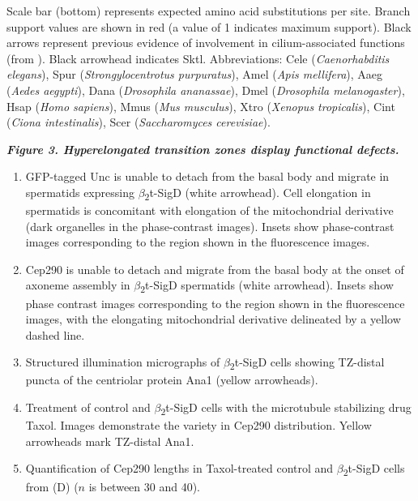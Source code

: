 \documentclass[12pt, twoside, letterpaper]{article}
\newcommand{\sigd}{$\beta$\textsubscript{2}t-SigD}
\begin{document}
\begin{doublespacing}
\begin{linenumbers}
\begin{enumerate}[label={(\Alph*)}, nolistsep]
      Scale bar (bottom) represents expected amino acid substitutions per site. Branch support values are shown in red (a value of 1 indicates maximum support).
      Black arrows represent previous evidence of involvement in cilium-associated functions (from \citep{xu2016phosphatidylinositol}).
      Black arrowhead indicates Sktl.
      Abbreviations: Cele (\textit{Caenorhabditis elegans}), Spur (\textit{Strongylocentrotus purpuratus}), Amel (\textit{Apis mellifera}), Aaeg (\textit{Aedes aegypti}), Dana (\textit{Drosophila ananassae}), Dmel (\textit{Drosophila melanogaster}), Hsap (\textit{Homo sapiens}), Mmus (\textit{Mus musculus}), Xtro (\textit{Xenopus tropicalis}), Cint (\textit{Ciona intestinalis}), Scer (\textit{Saccharomyces cerevisiae}).
    \end{enumerate}
    \bigskip
    \textbf{\itshape Figure 3. Hyperelongated transition zones display functional defects.}
    \begin{enumerate}[label={(\Alph*)}, nolistsep]
    \item GFP-tagged Unc is unable to detach from the basal body and migrate in spermatids expressing \sigd{} (white arrowhead).
      Cell elongation in spermatids is concomitant with elongation of the mitochondrial derivative (dark organelles in the phase-contrast images).
      Insets show phase-contrast images corresponding to the region shown in the fluorescence images.
    \item Cep290 is unable to detach and migrate from the basal body at the onset of axoneme assembly in \sigd{} spermatids (white arrowhead).
      Insets show phase contrast images corresponding to the region shown in the fluorescence images, with the
      elongating mitochondrial derivative delineated by a yellow dashed line.
    \item Structured illumination micrographs of \sigd{} cells showing TZ-distal puncta of the centriolar protein Ana1 (yellow arrowheads).
    \item Treatment of control and \sigd{} cells with the microtubule stabilizing drug Taxol.
      Images demonstrate the variety in Cep290 distribution.
      Yellow arrowheads mark TZ-distal Ana1.
    \item Quantification of Cep290 lengths in Taxol-treated control and \sigd{} cells from (D) ($n$ is between 30 and 40).
    \end{enumerate}
    \bigskip

\end{linenumbers}
\end{doublespacing}
\end{document}
